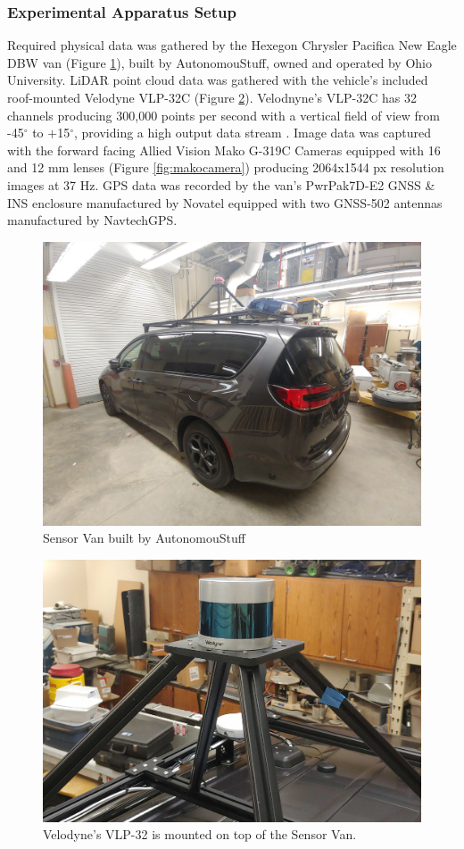 \documentclass[numbered,pdftex]{ohio-etd}
\begin{document}
{{{			\subsubsection{Experimental Apparatus Setup}\label{sec:experimental-apparatus-setup}{
		
				{Required physical data was gathered by the Hexegon Chrysler Pacifica New Eagle DBW van (Figure \ref{fig:van}), built by AutonomouStuff, owned and operated by Ohio University. LiDAR point cloud data was gathered with the vehicle's included roof-mounted Velodyne VLP-32C (Figure \ref{fig:vlp32mount}). Velodnyne's VLP-32C has 32 channels producing 300,000 points per second with a vertical field of view from -45$^{\circ}$ to $+$15$^{\circ}$, providing a high output data stream \cite{vlp_32c}. Image data was captured with the forward facing Allied Vision Mako G-319C Cameras equipped with 16 and 12 mm lenses (Figure \ref{fig:makocamera}) producing 2064x1544 px resolution images at 37 Hz. GPS data was recorded by the van's PwrPak7D-E2 GNSS \& INS enclosure manufactured by Novatel equipped with two GNSS-502 antennas manufactured by NavtechGPS.}
					
				\begin{figure}[H]
					\centering
					\includegraphics[width=0.7\linewidth]{Defense_Images/Van}
					\caption[Sensor Van]{Sensor Van built by AutonomouStuff}
					\label{fig:van}
				\end{figure}
			
				\begin{figure}[H]
					\centering
					\includegraphics[width=0.7\linewidth]{Defense_Images/vlp_32_mount_2}
					\caption[VLP 32 on Van]{Velodyne's VLP-32 is mounted on top of the Sensor Van.}
					\label{fig:vlp32mount}
				\end{figure}
				
}}}}
\end{document}
